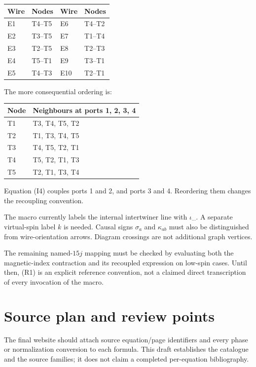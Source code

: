 \documentclass[11pt,a4paper]{article}
\begin{document}
\begin{center}
\begin{tabular}{ll@{\qquad}ll}\toprule
Wire&Nodes&Wire&Nodes\\\midrule
E1&T4--T5&E6&T4--T2\\
E2&T3--T5&E7&T1--T4\\
E3&T2--T5&E8&T2--T3\\
E4&T5--T1&E9&T3--T1\\
E5&T4--T3&E10&T2--T1\\\bottomrule
\end{tabular}
\end{center}
The more consequential ordering is:
\begin{center}
\begin{tabular}{ll}\toprule Node&Neighbours at ports 1, 2, 3, 4\\\midrule
T1&T3, T4, T5, T2\\T2&T1, T3, T4, T5\\T3&T4, T5, T2, T1\\T4&T5, T2, T1, T3\\T5&T2, T1, T3, T4\\\bottomrule
\end{tabular}
\end{center}
Equation (I4) couples ports 1 and 2, and ports 3 and 4. Reordering them changes the recoupling convention.

The macro currently labels the internal intertwiner line with $\iota_{\cdots}$. A separate virtual-spin label $k$ is needed. Causal signs $\sigma_a$ and $\kappa_{ab}$ must also be distinguished from wire-orientation arrows. Diagram crossings are not additional graph vertices.

The remaining named-$15j$ mapping must be checked by evaluating both the magnetic-index contraction and its recoupled expression on low-spin cases. Until then, (R1) is an explicit reference convention, not a claimed direct transcription of every invocation of the macro.

\section{Source plan and review points}
The final website should attach source equation/page identifiers and every phase or normalization conversion to each formula. This draft establishes the catalogue and the source families; it does not claim a completed per-equation bibliography.
\end{document}

